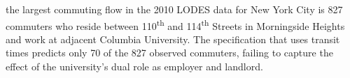 the largest commuting flow in the 2010 LODES data for New York City is 827 commuters who reside between 110\textsuperscript{th} and 114\textsuperscript{th} Streets in Morningside Heights and work at adjacent Columbia University. The specification that uses transit times predicts only 70 of the 827 observed commuters, failing to capture the effect of the university's dual role as employer and landlord.
